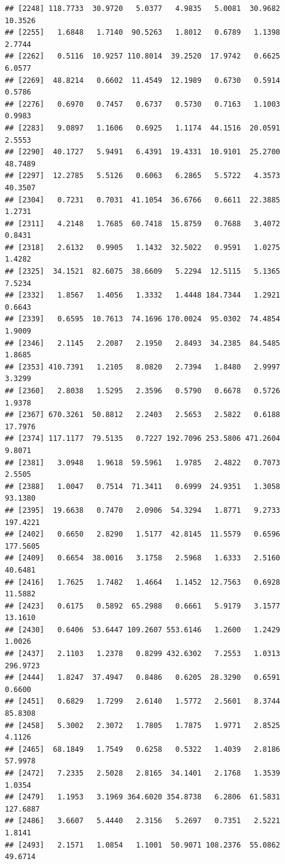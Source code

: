 \documentclass{article}\usepackage[]{graphicx}\usepackage[]{color}
\makeatletter
\newenvironment{kframe}{%
 \def\at@end@of@kframe{}%
 \ifinner\ifhmode%
  \def\at@end@of@kframe{\end{minipage}}%
  \begin{minipage}{\columnwidth}%
 \fi\fi%
 \def\FrameCommand##1{\hskip\@totalleftmargin \hskip-\fboxsep
 \colorbox{shadecolor}{##1}\hskip-\fboxsep
     \hskip-\linewidth \hskip-\@totalleftmargin \hskip\columnwidth}%
 \MakeFramed {\advance\hsize-\width
   \@totalleftmargin\z@ \linewidth\hsize
   \@setminipage}}%
 {\par\unskip\endMakeFramed%
 \at@end@of@kframe}
\newenvironment{knitrout}{}{} %
\makeatother
\begin{document}
\begin{knitrout}
\begin{kframe}
\begin{verbatim}
## [2248] 118.7733  30.9720   5.0377   4.9835   5.0081  30.9682  10.3526
## [2255]   1.6848   1.7140  90.5263   1.8012   0.6789   1.1398   2.7744
## [2262]   0.5116  10.9257 110.8014  39.2520  17.9742   0.6625   6.0577
## [2269]  48.8214   0.6602  11.4549  12.1989   0.6730   0.5914   0.5786
## [2276]   0.6970   0.7457   0.6737   0.5730   0.7163   1.1003   0.9983
## [2283]   9.0897   1.1606   0.6925   1.1174  44.1516  20.0591   2.5553
## [2290]  40.1727   5.9491   6.4391  19.4331  10.9101  25.2700  48.7489
## [2297]  12.2785   5.5126   0.6063   6.2865   5.5722   4.3573  40.3507
## [2304]   0.7231   0.7031  41.1054  36.6766   0.6611  22.3885   1.2731
## [2311]   4.2148   1.7685  60.7418  15.8759   0.7688   3.4072   0.8431
## [2318]   2.6132   0.9905   1.1432  32.5022   0.9591   1.0275   1.4282
## [2325]  34.1521  82.6075  38.6609   5.2294  12.5115   5.1365   7.5234
## [2332]   1.8567   1.4056   1.3332   1.4448 184.7344   1.2921   0.6643
## [2339]   0.6595  10.7613  74.1696 170.0024  95.0302  74.4854   1.9009
## [2346]   2.1145   2.2087   2.1950   2.8493  34.2385  84.5485   1.8685
## [2353] 410.7391   1.2105   8.0820   2.7394   1.8480   2.9997   3.3299
## [2360]   2.8038   1.5295   2.3596   0.5790   0.6678   0.5726   1.9378
## [2367] 670.3261  50.8812   2.2403   2.5653   2.5822   0.6188  17.7976
## [2374] 117.1177  79.5135   0.7227 192.7096 253.5806 471.2604   9.8071
## [2381]   3.0948   1.9618  59.5961   1.9785   2.4822   0.7073   2.5505
## [2388]   1.0047   0.7514  71.3411   0.6999  24.9351   1.3058  93.1380
## [2395]  19.6638   0.7470   2.0906  54.3294   1.8771   9.2733 197.4221
## [2402]   0.6650   2.8290   1.5177  42.8145  11.5579   0.6596 177.5605
## [2409]   0.6654  38.0016   3.1758   2.5968   1.6333   2.5160  40.6481
## [2416]   1.7625   1.7482   1.4664   1.1452  12.7563   0.6928  11.5882
## [2423]   0.6175   0.5892  65.2988   0.6661   5.9179   3.1577  13.1610
## [2430]   0.6406  53.6447 109.2607 553.6146   1.2600   1.2429   1.0026
## [2437]   2.1103   1.2378   0.8299 432.6302   7.2553   1.0313 296.9723
## [2444]   1.8247  37.4947   0.8486   0.6205  28.3290   0.6591   0.6600
## [2451]   0.6829   1.7299   2.6140   1.5772   2.5601   8.3744  85.8308
## [2458]   5.3002   2.3072   1.7805   1.7875   1.9771   2.8525   4.1126
## [2465]  68.1849   1.7549   0.6258   0.5322   1.4039   2.8186  57.9978
## [2472]   7.2335   2.5028   2.8165  34.1401   2.1768   1.3539   1.0354
## [2479]   1.1953   3.1969 364.6020 354.8738   6.2806  61.5831 127.6887
## [2486]   3.6607   5.4440   2.3156   5.2697   0.7351   2.5221   1.8141
## [2493]   2.1571   1.0854   1.1001  50.9071 108.2376  55.0862  49.6714

\end{verbatim}
\end{kframe}
\end{knitrout}
\end{document}
